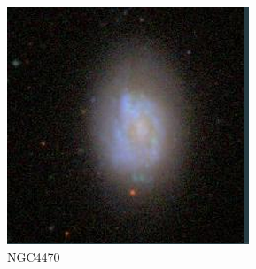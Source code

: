 \documentclass[9pt]{revtex4-1}
\begin{document}
\begin{figure}
\includegraphics[scale=0.3]{NGC4470.png}
\caption{NGC4470}
\end{figure}

\clearpage
\end{document}
